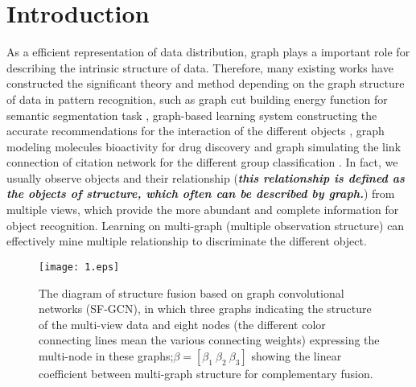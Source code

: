 \documentclass[review]{elsarticle}
\begin{document}
\section{Introduction}
As a efficient representation of data distribution, graph plays a important role for describing the intrinsic structure of data. Therefore, many existing works have constructed the significant theory and method depending on the graph structure of data in pattern recognition, such as graph cut building energy function for semantic segmentation task \cite{veksler2019efficient}, graph-based learning system constructing the accurate recommendations for the interaction of the different objects \cite{monti2017geometric} \cite{ying2018graph}, graph modeling molecules bioactivity for drug discovery \cite{defferrard2016convolutional} \cite{gilmer2017neural} and graph simulating the link connection of citation network for the different group classification \cite{defferrard2016convolutional}\cite{gilmer2017neural}\cite{khan2019multi}. In fact, we usually observe objects and their relationship (\textbf{\textsl{this relationship is defined as the objects of structure, which often can be described by graph.}}) from multiple views, which provide the more abundant and complete information for object recognition. Learning on multi-graph (multiple observation structure) can effectively mine multiple relationship to discriminate the different object.

\begin{figure*}[ht]
  \begin{center}
\texttt{[image: 1.eps]}
\end{center}
\vspace{-0.2in}
 \caption{The diagram of structure fusion based on graph convolutional networks (SF-GCN), in which three graphs indicating the structure of the multi-view data and eight nodes (the different color connecting lines mean the various connecting weights) expressing the multi-node in these graphs;$\beta=[\beta_{1}\ \beta_{2}\ \beta_{3}]$ showing the linear coefficient between multi-graph structure for complementary fusion.}
  \label{SF-GCN1}
 \end{figure*}
\end{document}
